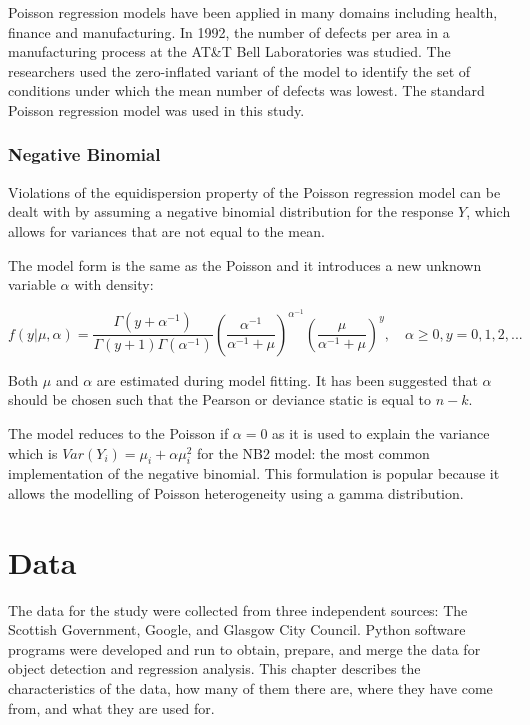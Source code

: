 \documentclass{thesis}
\begin{document}
Poisson regression models have been applied in many domains including health, finance and manufacturing. In 1992, the number of defects per area in a manufacturing process at the AT\&T Bell Laboratories was studied\cite{defects}. The researchers used the zero-inflated variant of the model to identify the set of conditions under which the mean number of defects was lowest. The standard Poisson regression model was used in this study.

\subsection{Negative Binomial}

Violations of the equidispersion property of the Poisson regression model can be dealt with by assuming a negative binomial distribution for the response $Y$, which allows for variances that are not equal to the mean.

The model form is the same as the Poisson and it introduces a new unknown variable $\alpha$ with density:

\begin{equation}
    f(y|\mu,\alpha) = \frac{\Gamma(y + \alpha^{-1})}{\Gamma(y+1)\Gamma(\alpha^{-1})}(\frac{\alpha^{-1}}{\alpha^{-1} + \mu})^{\alpha^{-1}}(\frac{\mu}{\alpha^{-1} + \mu})^y,\hspace{1em}\alpha\ge 0, y=0,1,2,...
\end{equation}

Both $\mu$ and $\alpha$ are estimated during model fitting. It has been suggested that $\alpha$ should be chosen such that the Pearson or deviance static is equal to $n - k$\cite{cameron_trivedi_2013}.

The model reduces to the Poisson if $\alpha = 0$ as it is used to explain the variance which is $Var(Y_i) = \mu_i + \alpha\mu_i^2$ for the NB2 model: the most common implementation of the negative binomial\cite{cameron_trivedi_2013}. This formulation is popular because it allows the modelling of Poisson heterogeneity using a gamma distribution\cite{ncss-neg-bin}.


\chapter{Data} \label{chapter:data}

The data for the study were collected from three independent sources: The Scottish Government, Google, and Glasgow City Council. Python software programs were developed and run to obtain, prepare, and merge the data for object detection and regression analysis. This chapter describes the characteristics of the data, how many of them there are, where they have come from, and what they are used for.
\end{document}
